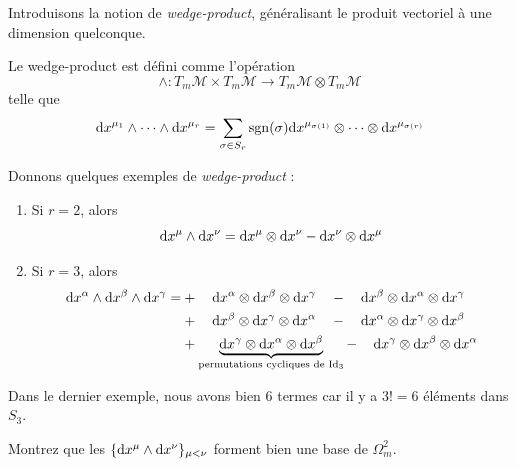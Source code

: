   Introduisons la notion de \emph{wedge-product}, généralisant le produit vectoriel à une dimension quelconque.
\begin{theoremframe}
    \begin{defi}
        Le wedge-product est défini comme l'opération 
        \begin{equation}
        \wedge : T_m\mathcal{M} \times T_m\mathcal{M} \to T_m \mathcal{M} \otimes T_m\mathcal{M}
        \end{equation}
        telle que
        \begin{equation}
            \mathrm{d} x^{\mu_1}\wedge \cdots\wedge \mathrm{d} x^{\mu_r} = \sum_{\sigma \in S_r} \operatorname{sgn}(\sigma) \mathrm{d} x^{\mu_{\sigma(1)}} \otimes \cdots \otimes \mathrm{d} x^{\mu_{\sigma(r)}}
        \end{equation}
    \end{defi}
\end{theoremframe}
\begin{exmp}
    Donnons quelques exemples de \emph{wedge-product} :
    \begin{enumerate}
        \item Si $r=2$, alors
        \begin{equation}
            \mathrm{d} x^{\mu}\wedge \mathrm{d} x^{\nu} = \mathrm{d} x^{\mu}\otimes \mathrm{d} x^{\nu} - \mathrm{d} x^{\nu}\otimes \mathrm{d} x^{\mu}
        \end{equation}
        \item Si $r=3$, alors
        \begin{align*}
            \mathrm{d} x^{\alpha}\wedge \mathrm{d} x^{\beta}\wedge \mathrm{d} x^{\gamma} =&+\quad \mathrm{d} x^{\alpha}\otimes \mathrm{d} x^{\beta}\otimes \mathrm{d} x^{\gamma} \quad - \quad\mathrm{d} x^{\beta}\otimes\mathrm{d} x^{\alpha}\otimes \mathrm{d} x^{\gamma}\\
            &+ \quad \mathrm{d} x^{\beta}\otimes \mathrm{d} x^{\gamma}\otimes \mathrm{d} x^{\alpha} \quad - \quad \mathrm{d} x^{\alpha}\otimes \mathrm{d} x^{\gamma}\otimes \mathrm{d} x^{\beta} \\
            &+\underbrace{
            \mathrm{d} x^{\gamma}\otimes \mathrm{d} x^{\alpha}\otimes \mathrm{d} x^{\beta}}_{\text{permutations cycliques de $\mathrm{Id}_3$}} - \, \quad
            \mathrm{d} x^{\gamma}\otimes \mathrm{d} x^{\beta}\otimes \mathrm{d} x^{\alpha}
\end{align*}
    \end{enumerate}
\end{exmp}
Dans le dernier exemple, nous avons bien 6 termes car il y a $3! = 6$ éléments dans $S_3$.
\begin{exerc}
    Montrez que les $\{ \mathrm{d} x^{\mu}\wedge \mathrm{d} x^{\nu} \}_{\mu<\nu}$ forment bien une base de $\Omega_m^2$.
\end{exerc}
